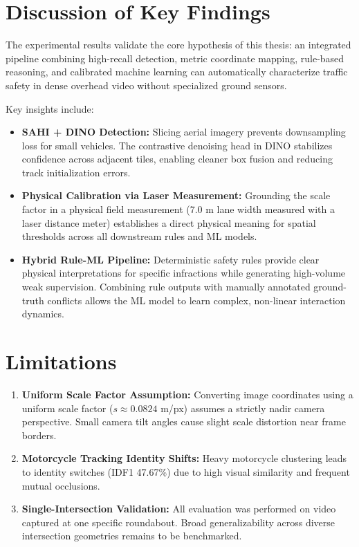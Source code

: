 \documentclass[12pt,a4paper]{report}
\begin{document}
\section{Discussion of Key Findings}

The experimental results validate the core hypothesis of this thesis: an integrated pipeline combining high-recall
detection, metric coordinate mapping, rule-based reasoning, and calibrated machine learning can automatically
characterize traffic safety in dense overhead video without specialized ground sensors.

Key insights include:
\begin{itemize}
    \item \textbf{SAHI + DINO Detection:} Slicing aerial imagery prevents downsampling loss for small vehicles.
          The contrastive denoising head in DINO stabilizes confidence across adjacent tiles, enabling cleaner
          box fusion and reducing track initialization errors.
    \item \textbf{Physical Calibration via Laser Measurement:} Grounding the scale factor in a physical field measurement
          (7.0 m lane width measured with a laser distance meter) establishes a direct physical meaning for spatial
          thresholds across all downstream rules and ML models.
    \item \textbf{Hybrid Rule-ML Pipeline:} Deterministic safety rules provide clear physical interpretations for
          specific infractions while generating high-volume weak supervision. Combining rule outputs with manually
          annotated ground-truth conflicts allows the ML model to learn complex, non-linear interaction dynamics.
\end{itemize}

\section{Limitations}

\begin{enumerate}
    \item \textbf{Uniform Scale Factor Assumption:} Converting image coordinates using a uniform scale factor
          ($s \approx 0.0824$ m/px) assumes a strictly nadir camera perspective. Small camera tilt angles cause slight
          scale distortion near frame borders.
    \item \textbf{Motorcycle Tracking Identity Shifts:} Heavy motorcycle clustering leads to identity switches (IDF1 47.67\%)
          due to high visual similarity and frequent mutual occlusions.
    \item \textbf{Single-Intersection Validation:} All evaluation was performed on video captured at one specific
          roundabout. Broad generalizability across diverse intersection geometries remains to be benchmarked.
\end{enumerate}
\end{document}
